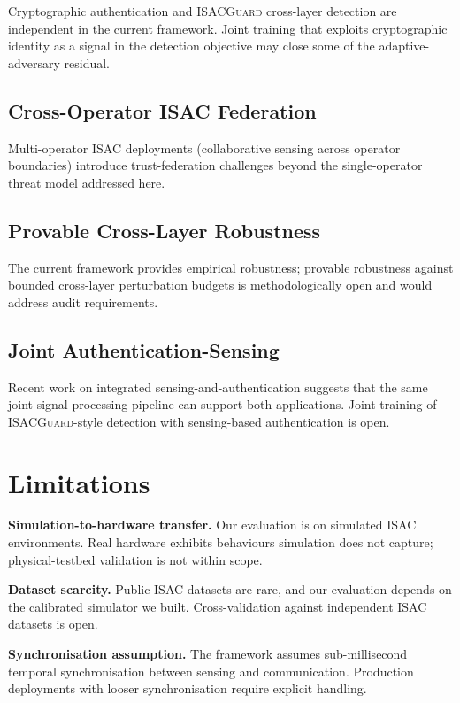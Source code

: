 \documentclass[sigconf,nonacm]{acmart}
\begin{document}
Cryptographic authentication and \textsc{ISACGuard} cross-layer
detection are independent in the current framework. Joint
training that exploits cryptographic identity as a signal in
the detection objective may close some of the
adaptive-adversary residual.

\subsection{Cross-Operator ISAC Federation}

Multi-operator ISAC deployments (collaborative sensing across
operator boundaries) introduce trust-federation challenges
beyond the single-operator threat model addressed here.

\subsection{Provable Cross-Layer Robustness}

The current framework provides empirical robustness; provable
robustness against bounded cross-layer perturbation budgets is
methodologically open and would address audit requirements.

\subsection{Joint Authentication-Sensing}

Recent work on integrated sensing-and-authentication suggests
that the same joint signal-processing pipeline can support both
applications. Joint training of \textsc{ISACGuard}-style
detection with sensing-based authentication is open.

\section{Limitations}

\textbf{Simulation-to-hardware transfer.} Our evaluation is on
simulated ISAC environments. Real hardware exhibits behaviours
simulation does not capture; physical-testbed validation is
not within scope.

\textbf{Dataset scarcity.} Public ISAC datasets are rare, and
our evaluation depends on the calibrated simulator we built.
Cross-validation against independent ISAC datasets is open.

\textbf{Synchronisation assumption.} The framework assumes
sub-millisecond temporal synchronisation between sensing and
communication. Production deployments with looser synchronisation
require explicit handling.
\end{document}
